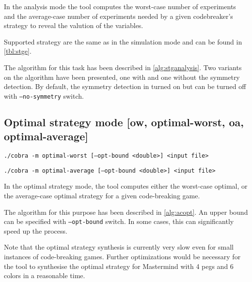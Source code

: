 In the analysis mode the tool computes
  the worst-case number of experiments and
  the average-case number of experiments needed by
  a given codebreaker's strategy
  to reveal the valution of the variables.

Supported strategy are the same as in the simulation mode and
  can be found in \autoref{tbl:stge}.

The algorithm for this task has been described in \autoref{alg:stganalysis}.
Two variants on the algorithm have been presented,
  one with and one without the symmetry detection.
By default, the symmetry detection in turned on
  but can be turned off with \texttt{--no-symmetry} switch.

\subsection{Optimal strategy mode [ow, optimal-worst, oa, optimal-average]}

\centerline{\texttt{./cobra -m optimal-worst [--opt-bound <double>] <input file> }}
\centerline{\texttt{./cobra -m optimal-average [--opt-bound <double>] <input file> }}

In the optimal strategy mode, the tool computes either the worst-case optimal,
  or the average-case optimal strategy for a given code-breaking game.

The algorithm for this purpose has been described in \autoref{alg:acopt}.
An upper bound can be specified with \texttt{--opt-bound} switch.
In some cases, this can significantly speed up the process.

Note that the optimal strategy synthesis is currently very slow even for
  small instances of code-breaking games.
Further optimizations would be necessary for the tool to synthesise the optimal
  strategy for Mastermind with 4 pegs and 6 colors in a reasonable time.
